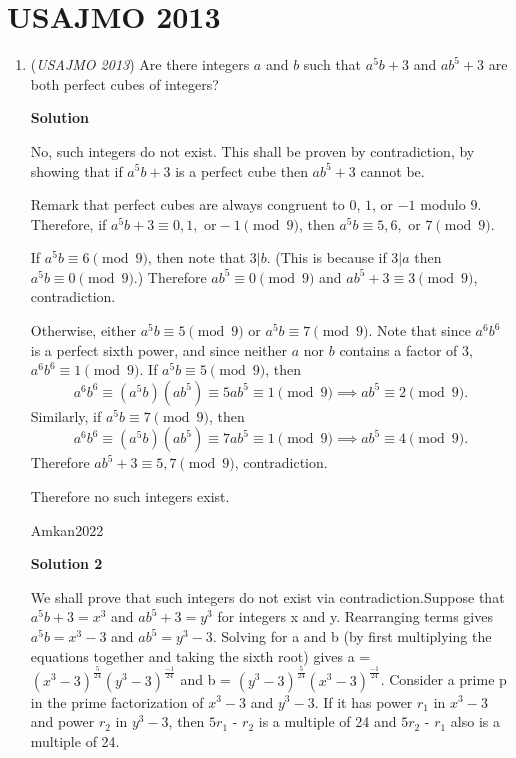 \section{USAJMO 2013}
        \begin{enumerate}
        	\item (\textit{USAJMO 2013}) Are there integers $a$ and $b$ such that $a^5b+3$ and $ab^5+3$ are both perfect cubes of integers?


 



\textbf{Solution}

No, such integers do not exist.  This shall be proven by contradiction, by showing that if $a^5b+3$ is a perfect cube then $ab^5+3$ cannot be.

 Remark that perfect cubes are always congruent to $0$, $1$, or $-1$ modulo $9$.  Therefore, if $a^5b+3\equiv 0,1,\text{ or} -1\pmod{9}$, then $a^5b\equiv 5,6,\text{ or }7\pmod{9}$.

 If $a^5b\equiv 6\pmod 9$, then note that $3|b$.  (This is because if $3|a$ then $a^5b\equiv 0\pmod 9$.)  Therefore $ab^5\equiv 0\pmod 9$ and $ab^5+3\equiv 3\pmod 9$, contradiction.

 Otherwise, either $a^5b\equiv 5\pmod 9$ or $a^5b\equiv 7\pmod 9$.  Note that since $a^6b^6$ is a perfect sixth power, and since neither $a$ nor $b$ contains a factor of $3$, $a^6b^6\equiv 1\pmod 9$.  If $a^5b\equiv 5\pmod 9$, then 
 \[a^6b^6\equiv (a^5b)(ab^5)\equiv 5ab^5\equiv 1\pmod 9\implies ab^5\equiv 2\pmod 9.\]  Similarly, if $a^5b\equiv 7\pmod 9$, then 
 \[a^6b^6\equiv (a^5b)(ab^5)\equiv 7ab^5\equiv 1\pmod 9\implies ab^5\equiv 4\pmod 9.\]  Therefore $ab^5+3\equiv 5,7\pmod 9$, contradiction.

 Therefore no such integers exist.

 Amkan2022

 



\textbf{Solution 2}

We shall prove that such integers do not exist via contradiction.Suppose that $a^5b + 3 = x^3$ and $ab^5 + 3 = y^3$ for integers x and y. Rearranging terms gives $a^5b = x^3 - 3$ and $ab^5 = y^3 - 3$. Solving for a and b (by first multiplying the equations together and taking the sixth root) gives a = $(x^3 - 3)^\frac{5}{24} (y^3 - 3)^\frac{-1}{24}$ and b = $(y^3 - 3)^\frac{5}{24} (x^3 - 3)^\frac{-1}{24}$. Consider a prime p in the prime factorization of $x^3 - 3$ and $y^3 - 3$. If it has power $r_1$ in $x^3 - 3$ and power $r_2$ in $y^3 - 3$, then $5r_1$ - $r_2$ is a multiple of 24 and $5r_2$ - $r_1$ also is a multiple of 24. 


\end{enumerate}
